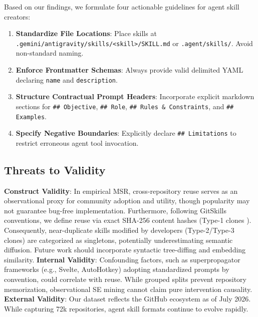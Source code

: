\documentclass[10pt,conference]{IEEEtran}
\begin{document}
Based on our findings, we formulate four actionable guidelines for agent skill creators:
\begin{enumerate}
    \item \textbf{Standardize File Locations}: Place skills at \texttt{.gemini/antigravity/skills/<skill>/SKILL.md} or \texttt{.agent/skills/}. Avoid non-standard naming.
    \item \textbf{Enforce Frontmatter Schemas}: Always provide valid delimited YAML declaring \texttt{name} and \texttt{description}.
    \item \textbf{Structure Contractual Prompt Headers}: Incorporate explicit markdown sections for \texttt{\#\# Objective}, \texttt{\#\# Role}, \texttt{\#\# Rules \& Constraints}, and \texttt{\#\# Examples}.
    \item \textbf{Specify Negative Boundaries}: Explicitly declare \texttt{\#\# Limitations} to restrict erroneous agent tool invocation.
\end{enumerate}

\subsection{Threats to Validity}
\textbf{Construct Validity}: In empirical MSR, cross-repository reuse serves as an observational proxy for community adoption and utility, though popularity may not guarantee bug-free implementation. Furthermore, following GitSkills conventions, we define reuse via exact SHA-256 content hashes (Type-1 clones \cite{roy2007survey}). Consequently, near-duplicate skills modified by developers (Type-2/Type-3 clones) are categorized as singletons, potentially underestimating semantic diffusion. Future work should incorporate syntactic tree-diffing and embedding similarity.
\textbf{Internal Validity}: Confounding factors, such as superpropagator frameworks (e.g., Svelte, AutoHotkey) adopting standardized prompts by convention, could correlate with reuse. While grouped splits prevent repository memorization, observational SE mining cannot claim pure intervention causality.
\textbf{External Validity}: Our dataset reflects the GitHub ecosystem as of July 2026. While capturing 72k repositories, agent skill formats continue to evolve rapidly.
\end{document}
